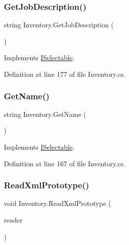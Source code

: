 \mbox{\label{class_inventory_a4781e2a97ef39ee9e137d64c819c7f8a}} 
\subsubsection{\texorpdfstring{Get\+Job\+Description()}{GetJobDescription()}}
{\footnotesize\ttfamily string Inventory.\+Get\+Job\+Description (\begin{DoxyParamCaption}{ }\end{DoxyParamCaption})}



Implements \hyperlink{interface_i_selectable_a4d0f9fa51a3d70a7fbcbb39e126e4c73}{I\+Selectable}.



Definition at line 177 of file Inventory.\+cs.

\mbox{\label{class_inventory_a627326dce64285113303015d25a80fd0}} 
\subsubsection{\texorpdfstring{Get\+Name()}{GetName()}}
{\footnotesize\ttfamily string Inventory.\+Get\+Name (\begin{DoxyParamCaption}{ }\end{DoxyParamCaption})}



Implements \hyperlink{interface_i_selectable_af676ba50e2cd5839438d3092743a79da}{I\+Selectable}.



Definition at line 167 of file Inventory.\+cs.

\mbox{\label{class_inventory_aac854a42e73fd7d0fa04ba3581cc339b}} 
\subsubsection{\texorpdfstring{Read\+Xml\+Prototype()}{ReadXmlPrototype()}}
{\footnotesize\ttfamily void Inventory.\+Read\+Xml\+Prototype (\begin{DoxyParamCaption}\item[{Xml\+Reader}]{reader }\end{DoxyParamCaption})}



